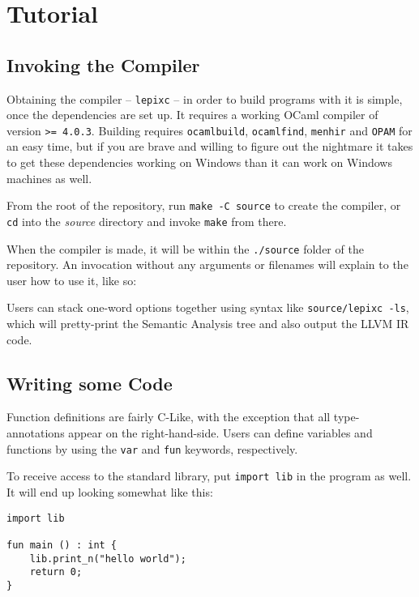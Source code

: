 \chapter{Tutorial}

\section{Invoking the Compiler}
Obtaining the \lepix{} compiler -- \lstinline|lepixc| -- in order to build \lepix{} programs with it is simple, once the dependencies are set up. It requires a working OCaml compiler of version \lstinline|>= 4.0.3|. Building requires \lstinline|ocamlbuild|, \lstinline|ocamlfind|, \lstinline|menhir| and \lstinline|OPAM| for an easy time, but if you are brave and willing to figure out the nightmare it takes to get these dependencies working on Windows than it can work on Windows machines as well.

From the root of the repository, run \lstinline|make -C source| to create the compiler, or \lstinline|cd| into the \emph{source} directory and invoke \lstinline|make| from there.

When the compiler is made, it will be within the \lstinline|./source| folder of the repository. An invocation without any arguments or filenames will explain to the user how to use it, like so:



Users can stack one-word options together using syntax like \lstinline|source/lepixc -ls|, which will pretty-print the Semantic Analysis tree and also output the LLVM IR code.

\section{Writing some Code}
Function definitions are fairly C-Like, with the exception that all type-annotations appear on the right-hand-side. Users can define variables and functions by using the \lstinline|var| and \lstinline|fun| keywords, respectively.

To receive access to the standard library, put \lstinline|import lib| in the program as well. It will end up looking somewhat like this:

\begin{lstlisting}
import lib

fun main () : int {
	lib.print_n("hello world");
	return 0;
}
\end{lstlisting}

